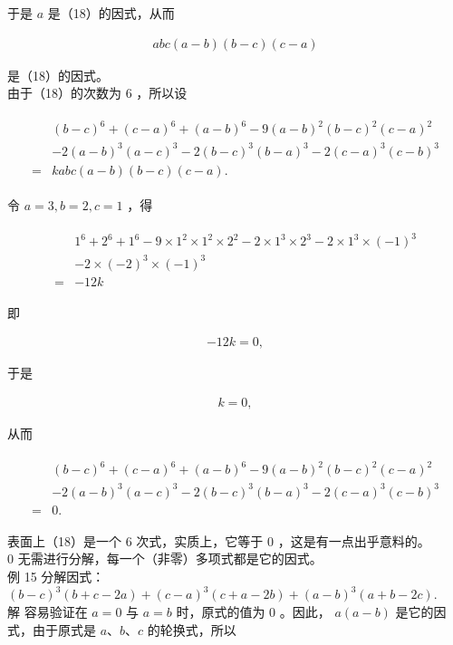 \documentclass[10pt]{article}
\begin{document}
于是 $a$ 是（18）的因式，从而

\begin{align*}
a b c(a-b)(b-c)(c-a)
\end{align*}

是（18）的因式。\\
由于（18）的次数为 6 ，所以设

\begin{align*}
\begin{aligned}
& (b-c)^{6}+(c-a)^{6}+(a-b)^{6}-9(a-b)^{2}(b-c)^{2}(c-a)^{2} \\
& -2(a-b)^{3}(a-c)^{3}-2(b-c)^{3}(b-a)^{3}-2(c-a)^{3}(c-b)^{3} \\
= & k a b c(a-b)(b-c)(c-a) .
\end{aligned}
\end{align*}

令 $a=3, b=2, c=1$ ，得

\begin{align*}
\begin{aligned}
& 1^{6}+2^{6}+1^{6}-9 \times 1^{2} \times 1^{2} \times 2^{2}-2 \times 1^{3} \times 2^{3}-2 \times 1^{3} \times(-1)^{3} \\
& -2 \times(-2)^{3} \times(-1)^{3} \\
= & -12 k
\end{aligned}
\end{align*}

即

\begin{align*}
-12 k=0,
\end{align*}

于是

\begin{align*}
k=0,
\end{align*}

从而

\begin{align*}
\begin{aligned}
& (b-c)^{6}+(c-a)^{6}+(a-b)^{6}-9(a-b)^{2}(b-c)^{2}(c-a)^{2} \\
& -2(a-b)^{3}(a-c)^{3}-2(b-c)^{3}(b-a)^{3}-2(c-a)^{3}(c-b)^{3} \\
= & 0 .
\end{aligned}
\end{align*}

表面上（18）是一个 6 次式，实质上，它等于 0 ，这是有一点出乎意料的。\\
0 无需进行分解，每一个（非零）多项式都是它的因式。\\
例 15 分解因式：\\
$(b-c)^{3}(b+c-2 a)+(c-a)^{3}(c+a-2 b)+(a-b)^{3}(a+b-2 c)$.\\
解 容易验证在 $a=0$ 与 $a=b$ 时，原式的值为 0 。因此， $a(a-b)$ 是它的因式，由于原式是 $a 、 b 、 c$ 的轮换式，所以
\end{document}

